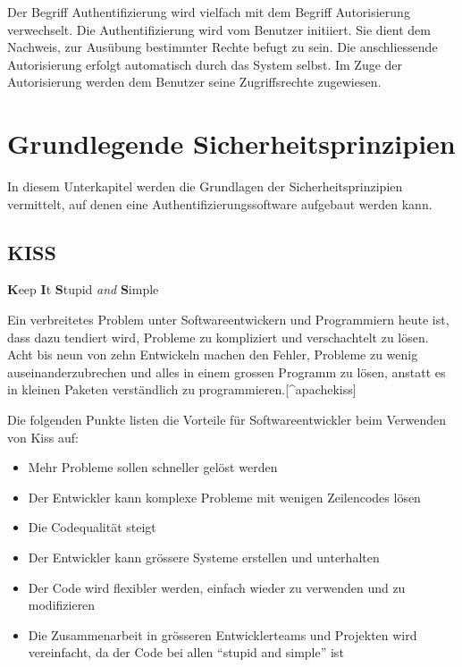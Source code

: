 Der Begriff Authentifizierung wird vielfach mit dem Begriff
Autorisierung verwechselt. Die Authentifizierung wird vom Benutzer
initiiert. Sie dient dem Nachweis, zur Ausübung bestimmter Rechte befugt
zu sein. Die anschliessende Autorisierung erfolgt automatisch durch das
System selbst. Im Zuge der Autorisierung werden dem Benutzer seine
Zugriffsrechte zugewiesen. \autocite{authentifizierungsdeforg}

\newpage

\newpage

\section{Grundlegende
Sicherheitsprinzipien}\label{grundlegende-sicherheitsprinzipien}

In diesem Unterkapitel werden die Grundlagen der Sicherheitsprinzipien
vermittelt, auf denen eine Authentifizierungssoftware aufgebaut werden
kann.

\subsection{KISS}\label{kiss}

\textbf{K}eep \textbf{I}t \textbf{S}tupid \emph{and} \textbf{S}imple

Ein verbreitetes Problem unter Softwareentwickern und Programmiern heute
ist, dass dazu tendiert wird, Probleme zu kompliziert und verschachtelt
zu lösen. Acht bis neun von zehn Entwickeln machen den Fehler, Probleme
zu wenig auseinanderzubrechen und alles in einem grossen Programm zu
lösen, anstatt es in kleinen Paketen verständlich zu
programmieren.{[}\^{}apachekiss{]}

Die folgenden Punkte listen die Vorteile für Softwareentwickler beim
Verwenden von Kiss auf:

\begin{itemize}
\tightlist
\item
  Mehr Probleme sollen schneller gelöst werden
\item
  Der Entwickler kann komplexe Probleme mit wenigen Zeilencodes lösen
\item
  Die Codequalität steigt
\item
  Der Entwickler kann grössere Systeme erstellen und unterhalten
\item
  Der Code wird flexibler werden, einfach wieder zu verwenden und zu
  modifizieren
\item
  Die Zusammenarbeit in grösseren Entwicklerteams und Projekten wird
  vereinfacht, da der Code bei allen ``stupid and simple'' ist
\end{itemize}

